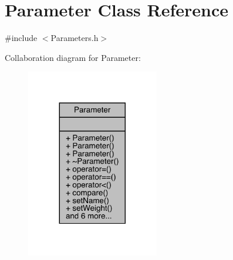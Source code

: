 \hypertarget{class_parameter}{}\section{Parameter Class Reference}
\label{class_parameter}


{\ttfamily \#include $<$Parameters.\+h$>$}



Collaboration diagram for Parameter\+:
\nopagebreak
\begin{figure}[H]
\begin{center}
\leavevmode
\includegraphics[width=164pt]{class_parameter__coll__graph}
\end{center}
\end{figure}

